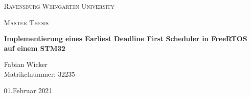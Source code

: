 \documentclass[../EDF Master Thesis.tex]{subfiles}
\begin{document}
    \centering
    {\scshape\LARGE Ravensburg-Weingarten University\par}
    \vspace{1.5cm}
    \begin{figure}[hb]
        \centering
        \rwulogo[width=0.4\columnwidth]
    \end{figure}
    \vspace{5cm}
    {\scshape\Large Master Thesis\par}
    \vspace{0.25cm}
    {\huge\bfseries Implementierung eines Earliest Deadline First Scheduler in FreeRTOS auf einem STM32\par}
    \vspace{4cm}
    {\Large Fabian Wicker \\
    Matrikelnummer: 32235\par}
    \vfill
    {\large 01.Februar 2021\par}
\end{document}
